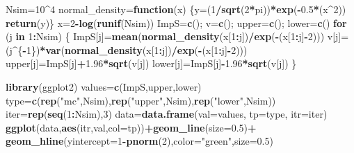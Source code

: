\documentclass[]{book}
\newenvironment{Shaded}{\begin{snugshade}}{\end{snugshade}}
\newcommand{\ControlFlowTok}[1]{\textcolor[rgb]{0.13,0.29,0.53}{\textbf{#1}}}
\newcommand{\DataTypeTok}[1]{\textcolor[rgb]{0.13,0.29,0.53}{#1}}
\newcommand{\DecValTok}[1]{\textcolor[rgb]{0.00,0.00,0.81}{#1}}
\newcommand{\FloatTok}[1]{\textcolor[rgb]{0.00,0.00,0.81}{#1}}
\newcommand{\KeywordTok}[1]{\textcolor[rgb]{0.13,0.29,0.53}{\textbf{#1}}}
\newcommand{\NormalTok}[1]{#1}
\newcommand{\OperatorTok}[1]{\textcolor[rgb]{0.81,0.36,0.00}{\textbf{#1}}}
\newcommand{\StringTok}[1]{\textcolor[rgb]{0.31,0.60,0.02}{#1}}
\begin{document}
\begin{Shaded}
\begin{Highlighting}[]
\NormalTok{Nsim=}\DecValTok{10}\OperatorTok{^}\DecValTok{4}
\NormalTok{normal_density=}\ControlFlowTok{function}\NormalTok{(x)}
\NormalTok{\{y=(}\DecValTok{1}\OperatorTok{/}\KeywordTok{sqrt}\NormalTok{(}\DecValTok{2}\OperatorTok{*}\NormalTok{pi))}\OperatorTok{*}\KeywordTok{exp}\NormalTok{(}\OperatorTok{-}\FloatTok{0.5}\OperatorTok{*}\NormalTok{(x}\OperatorTok{^}\DecValTok{2}\NormalTok{))}
\KeywordTok{return}\NormalTok{(y)\}}
\NormalTok{x=}\DecValTok{2}\OperatorTok{-}\KeywordTok{log}\NormalTok{(}\KeywordTok{runif}\NormalTok{(Nsim))}
\NormalTok{ImpS=}\KeywordTok{c}\NormalTok{(); v=}\KeywordTok{c}\NormalTok{(); upper=}\KeywordTok{c}\NormalTok{(); lower=}\KeywordTok{c}\NormalTok{()}
\ControlFlowTok{for}\NormalTok{ (j }\ControlFlowTok{in} \DecValTok{1}\OperatorTok{:}\NormalTok{Nsim)}
\NormalTok{\{}
\NormalTok{ImpS[j]=}\KeywordTok{mean}\NormalTok{(}\KeywordTok{normal_density}\NormalTok{(x[}\DecValTok{1}\OperatorTok{:}\NormalTok{j])}\OperatorTok{/}\KeywordTok{exp}\NormalTok{(}\OperatorTok{-}\NormalTok{(x[}\DecValTok{1}\OperatorTok{:}\NormalTok{j]}\OperatorTok{-}\DecValTok{2}\NormalTok{)))}
\NormalTok{v[j]=(j}\OperatorTok{^}\NormalTok{\{}\OperatorTok{-}\DecValTok{1}\NormalTok{\})}\OperatorTok{*}\KeywordTok{var}\NormalTok{(}\KeywordTok{normal_density}\NormalTok{(x[}\DecValTok{1}\OperatorTok{:}\NormalTok{j])}\OperatorTok{/}\KeywordTok{exp}\NormalTok{(}\OperatorTok{-}\NormalTok{(x[}\DecValTok{1}\OperatorTok{:}\NormalTok{j]}\OperatorTok{-}\DecValTok{2}\NormalTok{)))}
\NormalTok{upper[j]=ImpS[j]}\OperatorTok{+}\FloatTok{1.96}\OperatorTok{*}\KeywordTok{sqrt}\NormalTok{(v[j])}
\NormalTok{lower[j]=ImpS[j]}\OperatorTok{-}\FloatTok{1.96}\OperatorTok{*}\KeywordTok{sqrt}\NormalTok{(v[j])}
\NormalTok{\}}

\KeywordTok{library}\NormalTok{(ggplot2)}
\NormalTok{values=}\KeywordTok{c}\NormalTok{(ImpS,upper,lower)}
\NormalTok{type=}\KeywordTok{c}\NormalTok{(}\KeywordTok{rep}\NormalTok{(}\StringTok{"mc"}\NormalTok{,Nsim),}\KeywordTok{rep}\NormalTok{(}\StringTok{"upper"}\NormalTok{,Nsim),}\KeywordTok{rep}\NormalTok{(}\StringTok{"lower"}\NormalTok{,Nsim))}
\NormalTok{iter=}\KeywordTok{rep}\NormalTok{(}\KeywordTok{seq}\NormalTok{(}\DecValTok{1}\OperatorTok{:}\NormalTok{Nsim),}\DecValTok{3}\NormalTok{)}
\NormalTok{data=}\KeywordTok{data.frame}\NormalTok{(}\DataTypeTok{val=}\NormalTok{values, }\DataTypeTok{tp=}\NormalTok{type, }\DataTypeTok{itr=}\NormalTok{iter)}
\KeywordTok{ggplot}\NormalTok{(data,}\KeywordTok{aes}\NormalTok{(itr,val,}\DataTypeTok{col=}\NormalTok{tp))}\OperatorTok{+}\KeywordTok{geom_line}\NormalTok{(}\DataTypeTok{size=}\FloatTok{0.5}\NormalTok{)}\OperatorTok{+}
\KeywordTok{geom_hline}\NormalTok{(}\DataTypeTok{yintercept=}\DecValTok{1}\OperatorTok{-}\KeywordTok{pnorm}\NormalTok{(}\DecValTok{2}\NormalTok{),}\DataTypeTok{color=}\StringTok{"green"}\NormalTok{,}\DataTypeTok{size=}\FloatTok{0.5}\NormalTok{)}
\end{Highlighting}
\end{Shaded}
\end{document}
